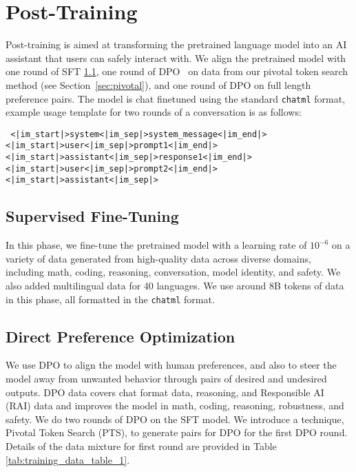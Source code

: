 \section{Post-Training}
Post-training is aimed at transforming the pretrained language model into an AI assistant that users can safely interact with. 
We align the pretrained model with one round of SFT \ref{sec:sft}, one round of DPO~\cite{rafailov2023direct} on data from our pivotal token search method (see Section~\ref{sec:pivotal}), and one round of DPO on full length preference pairs.
The model is chat finetuned using the standard \texttt{chatml} format, example usage template for two rounds of a conversation is as follows:
\begin{AIbox}{}
\tt \footnotesize 
<\!|\!im\_start\!|\!>system<\!|\!im\_sep\!|\!>system\_message<\!|\!im\_end\!|\!>\\
<\!|\!im\_start\!|\!>user<\!|\!im\_sep\!|\!>prompt1<\!|\!im\_end\!|\!><\!|\!im\_start\!|\!>assistant<\!|\!im\_sep\!|\!>response1<\!|\!im\_end\!|\!>\\
<\!|\!im\_start\!|\!>user<\!|\!im\_sep\!|\!>prompt2<\!|\!im\_end\!|\!><\!|\!im\_start\!|\!>assistant<\!|\!im\_sep\!|\!>
\end{AIbox}

\subsection{Supervised Fine-Tuning} \label{sec:sft}
In this phase, we fine-tune the pretrained model with a learning rate of $10^{-6}$ on a variety of data generated from high-quality data across diverse domains, including math, coding, reasoning, conversation, model identity, and safety.
We also added multilingual data for 40 languages.
We use around 8B tokens of data in this phase, all formatted in the \texttt{chatml} format.

\subsection{Direct Preference Optimization}
We use DPO \cite{rafailov2023direct} to align the model with human preferences, and also to steer the model away from unwanted behavior through pairs of desired and undesired outputs. 
DPO data covers chat format data, reasoning, and Responsible AI (RAI) data and improves the model in math, coding, reasoning, robustness, and safety.
We do two rounds of DPO on the SFT model. We introduce a technique, Pivotal Token Search (PTS), to generate pairs for DPO for the first DPO round. Details of the data mixture for first round are provided in Table \ref{tab:training_data_table_1}.

